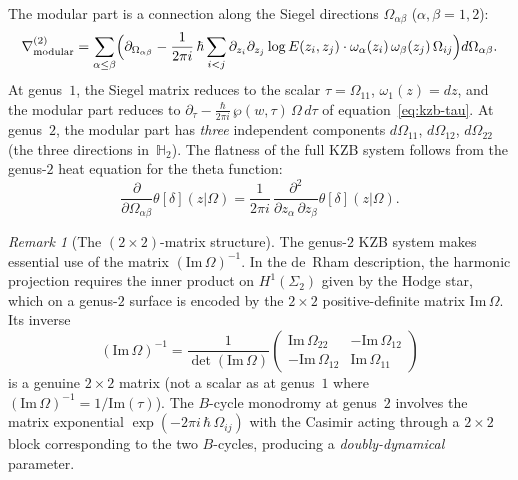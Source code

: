 \documentclass[11pt,reqno]{amsart}
\theoremstyle{definition}
\theoremstyle{remark}
\newtheorem{remark}[theorem]{Remark}
\newcommand{\HHH}{\mathbb{H}}
\numberwithin{equation}{section}
\begin{document}
The modular part is a connection along the Siegel
directions $\Omega_{\alpha\beta}$ ($\alpha, \beta = 1, 2$):
\begin{equation}\label{eq:kzb-g2-modular}
  \nabla^{(2)}_{\mathrm{modular}}
  = \sum_{\alpha \leq \beta}
  \Bigl(
  \partial_{\Omega_{\alpha\beta}}
  - \frac{1}{2\pi i}\,\hbar
  \sum_{i < j}
  \partial_{z_i}\partial_{z_j}
  \log E(z_i, z_j) \cdot
  \omega_\alpha(z_i)\,\omega_\beta(z_j)\,
  \Omega_{ij}
  \Bigr)
  d\Omega_{\alpha\beta}.
\end{equation}
At genus~$1$, the Siegel matrix reduces to the scalar
$\tau = \Omega_{11}$, $\omega_1(z) = dz$, and the modular
part reduces to
$\partial_\tau - \frac{\hbar}{2\pi i}\,
\wp(w, \tau)\,\Omega\,d\tau$
of equation~\eqref{eq:kzb-tau}. At genus~$2$, the modular
part has \emph{three} independent components
$d\Omega_{11}$, $d\Omega_{12}$, $d\Omega_{22}$ (the three
directions in~$\HHH_2$). The flatness of the full KZB
system follows from the genus-$2$ heat equation for the
theta function:
\begin{equation}\label{eq:heat-g2}
  \frac{\partial}{\partial \Omega_{\alpha\beta}}
  \theta[\delta](z|\Omega)
  = \frac{1}{2\pi i}\,
  \frac{\partial^2}{\partial z_\alpha\,\partial z_\beta}
  \theta[\delta](z|\Omega).
\end{equation}

\begin{remark}[The $(2 \times 2)$-matrix structure]
\label{rem:matrix-structure-g2}
The genus-$2$ KZB system makes essential use of the
matrix $(\mathrm{Im}\,\Omega)^{-1}$. In the de~Rham
description, the harmonic projection requires the
inner product on $H^1(\Sigma_2)$ given by the Hodge
star, which on a genus-$2$ surface is encoded by the
$2 \times 2$ positive-definite matrix
$\mathrm{Im}\,\Omega$. Its inverse
\begin{equation}\label{eq:im-omega-inv}
  (\mathrm{Im}\,\Omega)^{-1}
  = \frac{1}{\det(\mathrm{Im}\,\Omega)}
  \begin{pmatrix}
    \mathrm{Im}\,\Omega_{22} &
    -\mathrm{Im}\,\Omega_{12} \\
    -\mathrm{Im}\,\Omega_{12} &
    \mathrm{Im}\,\Omega_{11}
  \end{pmatrix}
\end{equation}
is a genuine $2 \times 2$ matrix (not a scalar as at
genus~$1$ where $(\mathrm{Im}\,\Omega)^{-1} =
1/\mathrm{Im}(\tau)$). The $B$-cycle monodromy at
genus~$2$ involves the matrix exponential
$\exp(-2\pi i\,\hbar\,\Omega_{ij})$ with the Casimir
acting through a $2 \times 2$ block corresponding to
the two $B$-cycles, producing a \emph{doubly-dynamical}
parameter.
\end{remark}
\end{document}
